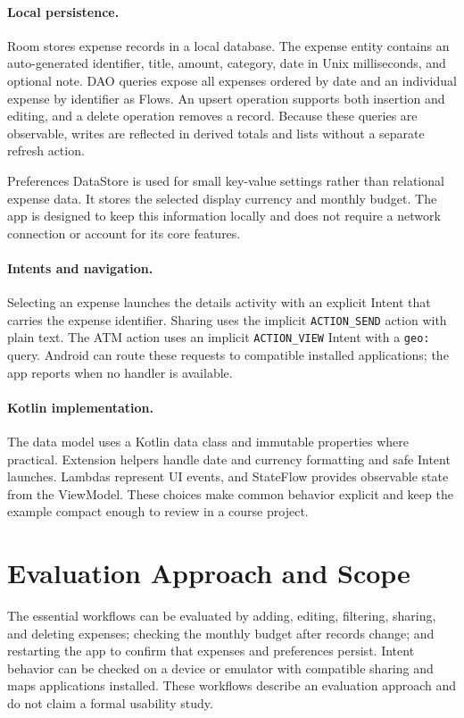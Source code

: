 \documentclass[sigconf,nonacm]{acmart}
\begin{document}
\paragraph{Local persistence.} Room stores expense records in a local database. The expense entity contains an auto-generated identifier, title, amount, category, date in Unix milliseconds, and optional note. DAO queries expose all expenses ordered by date and an individual expense by identifier as Flows. An upsert operation supports both insertion and editing, and a delete operation removes a record. Because these queries are observable, writes are reflected in derived totals and lists without a separate refresh action.

Preferences DataStore is used for small key-value settings rather than relational expense data. It stores the selected display currency and monthly budget. The app is designed to keep this information locally and does not require a network connection or account for its core features.

\paragraph{Intents and navigation.} Selecting an expense launches the details activity with an explicit Intent that carries the expense identifier. Sharing uses the implicit \texttt{ACTION\_SEND} action with plain text. The ATM action uses an implicit \texttt{ACTION\_VIEW} Intent with a \texttt{geo:} query. Android can route these requests to compatible installed applications; the app reports when no handler is available.

\paragraph{Kotlin implementation.} The data model uses a Kotlin data class and immutable properties where practical. Extension helpers handle date and currency formatting and safe Intent launches. Lambdas represent UI events, and StateFlow provides observable state from the ViewModel. These choices make common behavior explicit and keep the example compact enough to review in a course project.

\section{Evaluation Approach and Scope}
The essential workflows can be evaluated by adding, editing, filtering, sharing, and deleting expenses; checking the monthly budget after records change; and restarting the app to confirm that expenses and preferences persist. Intent behavior can be checked on a device or emulator with compatible sharing and maps applications installed. These workflows describe an evaluation approach and do not claim a formal usability study.
\end{document}
